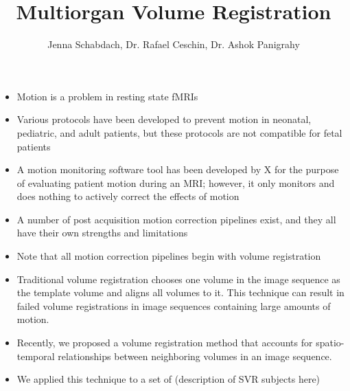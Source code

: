 \documentclass[12pt]{article}
\begin{document}
\title{Multiorgan Volume Registration}
\author{Jenna Schabdach, Dr. Rafael Ceschin, Dr. Ashok Panigrahy}
\maketitle

\begin{itemize}
\item Motion is a problem in resting state fMRIs
\item Various protocols have been developed to prevent motion in neonatal, pediatric, and adult patients, but these protocols are not compatible for fetal patients
\item A motion monitoring software tool has been developed by X for the purpose of evaluating patient motion during an MRI; however, it only monitors and does nothing to actively correct the effects of motion
\item A number of post acquisition motion correction pipelines exist, and they all have their own strengths and limitations
\item Note that all motion correction pipelines begin with volume registration
\item Traditional volume registration chooses one volume in the image sequence as the template volume and aligns all volumes to it. This technique can result in failed volume registrations in image sequences containing large amounts of motion.
\item Recently, we proposed a volume registration method that accounts for spatio-temporal relationships between neighboring volumes in an image sequence.
\item We applied this technique to a set of (description of SVR subjects here)

\end{itemize}
\end{document}
